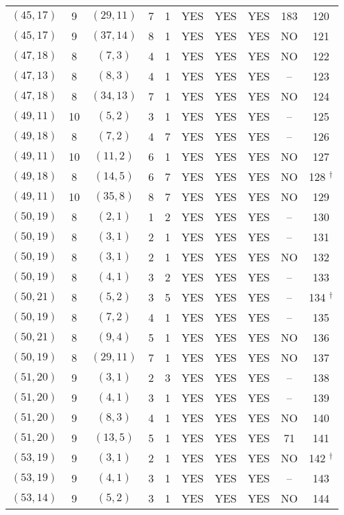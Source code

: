 \begin{longtable}{|c|c|c|c|c|c|c|c|c|c|}
$(45, 17)$ & 9 & $(29, 11)$ & 7 & 1 & YES & YES & YES & 183 & 120\\
$(45, 17)$ & 9 & $(37, 14)$ & 8 & 1 & YES & YES & YES & NO & 121\\
$(47, 18)$ & 8 & $(7, 3)$ & 4 & 1 & YES & YES & YES & NO & 122\\
$(47, 13)$ & 8 & $(8, 3)$ & 4 & 1 & YES & YES & YES & -- & 123\\
$(47, 18)$ & 8 & $(34, 13)$ & 7 & 1 & YES & YES & YES & NO & 124\\
$(49, 11)$ & 10 & $(5, 2)$ & 3 & 1 & YES & YES & YES & -- & 125\\
$(49, 18)$ & 8 & $(7, 2)$ & 4 & 7 & YES & YES & YES & -- & 126\\
$(49, 11)$ & 10 & $(11, 2)$ & 6 & 1 & YES & YES & YES & NO & 127\\
$(49, 18)$ & 8 & $(14, 5)$ & 6 & 7 & YES & YES & YES & NO & 128 ${}^\dagger$\\
$(49, 11)$ & 10 & $(35, 8)$ & 8 & 7 & YES & YES & YES & NO & 129\\
$(50, 19)$ & 8 & $(2, 1)$ & 1 & 2 & YES & YES & YES & -- & 130\\
$(50, 19)$ & 8 & $(3, 1)$ & 2 & 1 & YES & YES & YES & -- & 131\\
$(50, 19)$ & 8 & $(3, 1)$ & 2 & 1 & YES & YES & YES & NO & 132\\
$(50, 19)$ & 8 & $(4, 1)$ & 3 & 2 & YES & YES & YES & -- & 133\\
$(50, 21)$ & 8 & $(5, 2)$ & 3 & 5 & YES & YES & YES & -- & 134 ${}^\dagger$\\
$(50, 19)$ & 8 & $(7, 2)$ & 4 & 1 & YES & YES & YES & -- & 135\\
$(50, 21)$ & 8 & $(9, 4)$ & 5 & 1 & YES & YES & YES & NO & 136\\
$(50, 19)$ & 8 & $(29, 11)$ & 7 & 1 & YES & YES & YES & NO & 137\\
$(51, 20)$ & 9 & $(3, 1)$ & 2 & 3 & YES & YES & YES & -- & 138\\
$(51, 20)$ & 9 & $(4, 1)$ & 3 & 1 & YES & YES & YES & -- & 139\\
$(51, 20)$ & 9 & $(8, 3)$ & 4 & 1 & YES & YES & YES & NO & 140\\
$(51, 20)$ & 9 & $(13, 5)$ & 5 & 1 & YES & YES & YES & 71 & 141\\
$(53, 19)$ & 9 & $(3, 1)$ & 2 & 1 & YES & YES & YES & NO & 142 ${}^\dagger$\\
$(53, 19)$ & 9 & $(4, 1)$ & 3 & 1 & YES & YES & YES & -- & 143\\
$(53, 14)$ & 9 & $(5, 2)$ & 3 & 1 & YES & YES & YES & NO & 144\\

\end{longtable}
